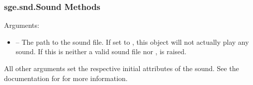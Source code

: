 \documentclass[letterpaper,10pt,english]{sphinxmanual}
\begin{document}
\subsubsection{sge.snd.Sound Methods}
\label{snd:sge-snd-sound-methods}

\begin{fulllineitems}
\label{snd:sge.snd.Sound.__init__}
Arguments:
\begin{itemize}
\item {} 
 -- The path to the sound file.  If set to
, this object will not actually play any sound.
If this is neither a valid sound file nor ,
 is raised.

\end{itemize}

All other arguments set the respective initial attributes of the
sound.  See the documentation for {\hyperref[snd:sge.snd.Sound]{\emph{}}} for
more information.

\end{fulllineitems}

\end{document}

